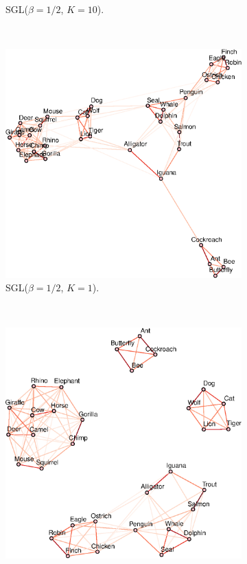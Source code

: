 \begin{figure}[!htb]
\begin{subfigure}[b]{0.475\textwidth}
      \caption{\textsf{SGL}($\beta = 1/2$, $K = 10$).}
    \end{subfigure}\\
    \begin{subfigure}[b]{0.475\textwidth}
      \includegraphics[width=\textwidth]{animals/latex/figures/animals_graph_k1.eps}
      \caption{\textsf{SGL}($\beta = 1/2$, $K = 1$).}
    \end{subfigure}
    ~
    \begin{subfigure}[b]{0.475\textwidth}
      \includegraphics[width=\textwidth]{animals/latex/figures/animals_graph_k4.eps}

\end{subfigure}
\end{figure}
